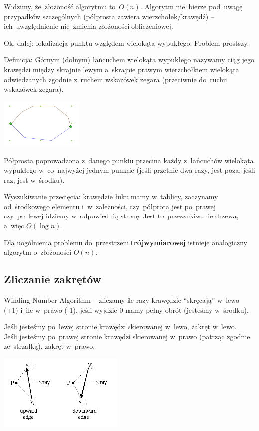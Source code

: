 Widzimy, że~złożoność algorytmu to~$O(n)$. Algorytm nie~bierze pod~uwagę przypadków szczególnych (półprosta zawiera wierzchołek/krawędź) -- ich~uwzględnienie nie~zmienia złożoności obliczeniowej.

Ok, dalej: lokalizacja punktu względem wielokąta wypukłego. Problem prostszy.

Definicja: Górnym (dolnym) łańcuchem wielokąta wypukłego nazywamy ciąg jego krawędzi między skrajnie lewym a~skrajnie prawym wierzchołkiem wielokąta odwiedzanych zgodnie z~ruchem wskazówek zegara (przeciwnie do~ruchu wskazówek zegara).
\begin{center}
	\includegraphics[width=4cm]{03/lancuch}
\end{center}

Półprosta poprowadzona z~danego punktu przecina każdy z~łańcuchów wielokąta wypukłego w~co~najwyżej jednym punkcie (jeśli przetnie dwa razy, jest poza; jeśli raz, jest w~środku).

Wyszukiwanie przecięcia:
krawędzie łuku mamy w~tablicy, zaczynamy od~środkowego elementu i~w~zależności, czy~półprota jest po~prawej czy~po~lewej idziemy w~odpowiednią stronę. Jest to~przeszukiwanie drzewa, a~więc $O(\log n)$.

Dla uogólnienia problemu do~przestrzeni \textbf{trójwymiarowej} istnieje analogiczny algorytm o~złożoności $O(n)$.

\subsection{Zliczanie zakrętów}
Winding Number Algorithm -- zliczamy ile razy krawędzie ``skręcają'' w~lewo (+1) i~ile w~prawo (-1), jeśli wyjdzie 0 mamy pełny obrót (jesteśmy w~środku).

Jeśli jesteśmy po~lewej stronie krawędzi skierowanej w~lewo, zakręt w~lewo.\\
Jeśli jesteśmy po~prawej stronie krawędzi skierowanej w~prawo (patrząc zgodnie ze~strzałką), zakręt w~prawo.
\begin{center}
	\includegraphics[width=6cm]{03/uede}
\end{center}

